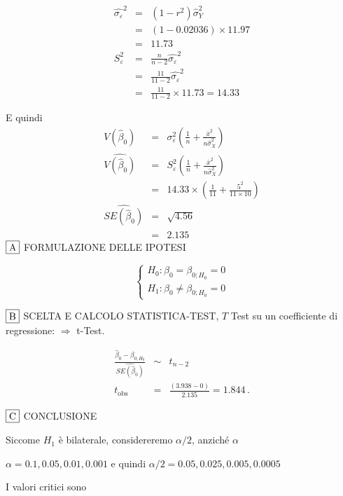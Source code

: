 \documentclass[
  11pt,
]{book}
\theoremstyle{mytheoremstyle}
\theoremstyle{mydefstyle}
\newenvironment{sol}
  {
  \begin{tcolorbox}[enhanced,breakable,arc=0.1mm,boxrule=1pt,colback=white,colframe=iblue,
  title=\bf \fontfamily{lmss}\selectfont \hspace{.5 cm} Soluzione,drop fuzzy shadow]

}{
\end{tcolorbox}
  }
\begin{document}
\begin{sol}
\begin{eqnarray*}
\hat{\sigma_\varepsilon}^2&=&(1-r^2)\hat\sigma_Y^2\\
&=& (1- 0.02036 )\times 11.97 \\
   &=&  11.73 \\
   S_\varepsilon^2 &=& \frac{n} {n-2} \hat{\sigma_\varepsilon}^2\\
   &=&  \frac{ 11 } { 11 -2} \hat{\sigma_\varepsilon}^2 \\
 &=&  \frac{ 11 } { 11 -2} \times  11.73  =  14.33  
\end{eqnarray*}

E quindi\begin{eqnarray*}
V(\hat\beta_{0}) &=& \sigma_{\varepsilon}^{2} \left( \frac{1} {n}  +  \frac{\bar{x}^{2}} {n \hat{\sigma}^{2}_{X}} \right)\\
\widehat{V(\hat\beta_{0})} &=& S_{\varepsilon}^{2}\left( \frac{1} {n}  +  \frac{\bar{x}^{2}} {n \hat{\sigma}^{2}_{X}} \right)\ \\
 &=&  14.33 \times\left( \frac{1} { 11 }  +  \frac{ 5 ^{2}} { 11 \times  10 } \right)\\
 \widehat{SE(\hat\beta_{0})}        &=&  \sqrt{ 4.56 }\\
 &=&  2.135 
\end{eqnarray*}
\(\fbox{A}\) FORMULAZIONE DELLE IPOTESI

\[\begin{cases}
   H_0: \beta_0 = \beta_{0;H_0}=0 \\
   H_1: \beta_0 \neq \beta_{0;H_0}=0 
   \end{cases}\]

\(\fbox{B}\) SCELTA E CALCOLO STATISTICA-TEST, \(T\)
Test su un coefficiente di regressione: \(\Rightarrow\) t-Test.

\begin{eqnarray*}
 \frac{\hat\beta_{ 0 } - \beta_{ 0 ;H_0}} {\widehat{SE(\hat\beta_{ 0 })}}&\sim&t_{n-2}\\
   t_{\text{obs}}
&=& \frac{ ( 3.938 -  0 )} { 2.135 }
 =   1.844 \, .
\end{eqnarray*}

\(\fbox{C}\) CONCLUSIONE

Siccome \(H_1\) è bilaterale, considereremo \(\alpha/2\),
anziché \(\alpha\)

\(\alpha=0.1, 0.05, 0.01, 0.001\) e quindi \(\alpha/2=0.05, 0.025, 0.005, 0.0005\)

I valori critici sono


\end{sol}
\end{document}
